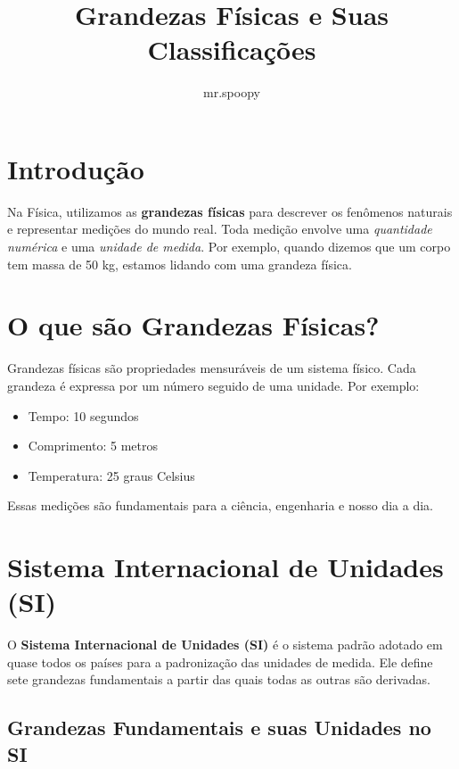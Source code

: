 \documentclass[portuguese,11pt,a4paper,oneside,onecolumn,notitlepage]{article}
\title{\textbf{Grandezas Físicas e Suas Classificações}}
\author{mr.spoopy}
\date{}
\begin{document}
	\maketitle
	
	\section{Introdução}
	Na Física, utilizamos as \textbf{grandezas físicas} para descrever os fenômenos naturais e representar medições do mundo real. Toda medição envolve uma \textit{quantidade numérica} e uma \textit{unidade de medida}. Por exemplo, quando dizemos que um corpo tem massa de 50 kg, estamos lidando com uma grandeza física.
	
	\section{O que são Grandezas Físicas?}
	Grandezas físicas são propriedades mensuráveis de um sistema físico. Cada grandeza é expressa por um número seguido de uma unidade. Por exemplo:
	\begin{itemize}
		\item Tempo: 10 segundos
		\item Comprimento: 5 metros
		\item Temperatura: 25 graus Celsius
	\end{itemize}
	
	Essas medições são fundamentais para a ciência, engenharia e nosso dia a dia.
	
	\section{Sistema Internacional de Unidades (SI)}
	O \textbf{Sistema Internacional de Unidades (SI)} é o sistema padrão adotado em quase todos os países para a padronização das unidades de medida. Ele define sete grandezas fundamentais a partir das quais todas as outras são derivadas.
	
	\subsection*{Grandezas Fundamentais e suas Unidades no SI}
	
\end{document}
